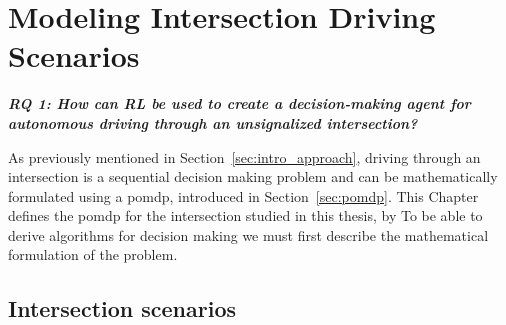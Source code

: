 \chapter{Modeling Intersection Driving Scenarios}
\label{ch:modeling_intersection}
\begin{center}
  \textit{\textbf{RQ 1: How can RL be used to create a decision-making agent for autonomous driving through an unsignalized intersection?}}
  \end{center}
  \vspace{12pt}
  
As previously mentioned in Section~\ref{sec:intro_approach}, driving through an intersection is a sequential decision making problem and can be mathematically formulated using a \gls{pomdp}, introduced in Section~\ref{sec:pomdp}. This Chapter defines the \gls{pomdp} for the intersection studied in this thesis, by 
To be able to derive algorithms for decision making we must first describe the mathematical formulation of the problem.  

\section{Intersection scenarios}

    
    
  
  
